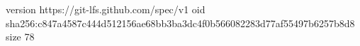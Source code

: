 version https://git-lfs.github.com/spec/v1
oid sha256:c847a4587c444d512156ae68bb3ba3dc4f0b566082283d77af55497b6257b8d8
size 78
